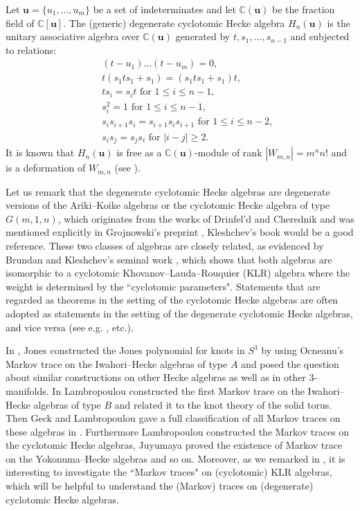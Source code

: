 \documentclass[a4paper, oneside]{amsart}
\numberwithin{equation}{section}
\theoremstyle{definition}
\theoremstyle{remark}
\begin{document}
Let $\boldsymbol{u}=\{u_1, \ldots, u_m\}$ be a set of indeterminates and let $\mathbb{C}(\boldsymbol{u})$ be the fraction field of $\mathbb{C}[\boldsymbol{u}]$. The (generic) degenerate cyclotomic Hecke algebra $H_n(\boldsymbol{u})$ is the unitary  associative algebra over $\mathbb{C}(\boldsymbol{u})$ generated by $t, s_1, \ldots, s_{n-1}$ and subjected to relations:
\begin{eqnarray*}
&&(t-u_1)\dots(t-u_m)=0,\\
&&t(s_1ts_1+s_1)=(s_1ts_1+s_1)t,\\
&&ts_i=s_it\text{ for }1\leq i\leq n-1,\\
&&s_i^2=1 \text{ for } 1\le i\leq n-1,\\
&&s_is_{i+1}s_i=s_{i+1}s_is_{i+1} \text{ for  }1\le i\leq n-2,\\
&&s_is_j=s_js_i \text{ for }|i-j|\geq 2.
\end{eqnarray*}
It is known that $H_{n}(\boldsymbol{u})$ is free as a $\mathbb{C}(\boldsymbol{u})$-module of rank $|W_{m,n}|=m^nn!$ and is a deformation of $W_{m,n}$ (see \cite[\S7]{K}).


Let us remark that the degenerate cyclotomic Hecke algebras are degenerate versions of the Ariki--Koike algebras or the cyclotomic Hecke algebra of type $G(m,1,n)$, which originates from the works of Drinfel'd \cite{Drinfeld} and Cherednik \cite{Cherednik} and was mentioned explicitly in Grojnowski's preprint \cite{Grojnowski}, Kleshchev's book \cite{K} would be a good reference. These two classes of algebras are closely related, as evidenced by Brundan and Kleshchev's seminal work \cite{BK-Block},  which shows that both algebras are isomorphic to a cyclotomic  Khovanov--Lauda--Rouquier (KLR)  algebra where the weight is determined by the  ``cyclotomic parameters".  Statements that are regarded as theorems in the setting of the cyclotomic Hecke algebras are often adopted as statements in the setting of the degenerate cyclotomic Hecke algebras, and vice versa (see e.g. \cite[\S6]{AMR}, \cite{BK-Block, BK-Math.Z., Z1,Z2} etc.).

In \cite{Jones}, Jones  constructed the Jones polynomial for knots
in $S^3$ by using Ocneanu's Markov trace on the Iwahori--Hecke algebras of type
$A$ and posed the question about similar constructions on other Hecke algebras as well
as in other 3-manifolds. In \cite{La94} Lambropoulou constructed the first Markov trace on the Iwahori--Hecke algebras of type $B$ and related it to the knot theory of the solid torus.  Then Geck and Lambropoulou  gave a full classification of all Markov traces on these algebras in \cite{GL,Geck}. Furthermore Lambropoulou \cite{L} constructed the Markov traces on the cyclotomic Hecke algebras, Juyumaya \cite{Juyumaya} proved the existence
of Markov trace on the Yokonuma--Hecke algebras and so on.  Moreover, as we remarked in \cite[Remarks~5.7(ii)]{Z2}, it is interesting to investigate the ``Markov traces" on (cyclotomic) KLR algebras, which will be helpful to understand the (Markov) traces on (degenerate) cyclotomic Hecke algebras.
\end{document}

